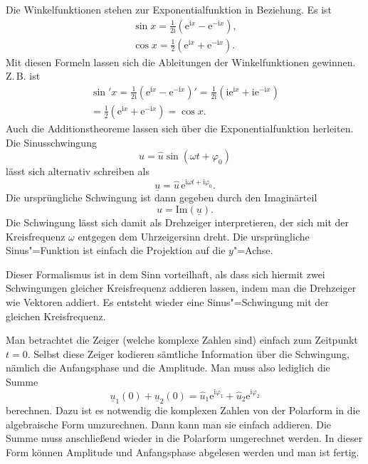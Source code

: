 \documentclass[a4paper,11pt,fleqn,twocolumn,twoside]{scrartcl}
\numberwithin{equation}{section}
\newcommand{\ui}{\mathrm i}
\newcommand{\ee}{\mathrm e}
\begin{document}
Die Winkelfunktionen stehen zur Exponentialfunktion
in Beziehung. Es ist%
\begin{gather}
\sin x = \frac{1}{2\ui}(\mathrm{e}^{\ui x}-\mathrm{e}^{-\ui x}),\\
\cos x = \frac{1}{2}(\mathrm{e}^{\ui x}+\mathrm{e}^{-\ui x}).
\end{gather}
Mit diesen Formeln lassen sich die Ableitungen der Winkelfunktionen
gewinnen. Z.\,B. ist%
\begin{gather}
\sin' x = \frac{1}{2\ui}(\ee^{\ui x}-\ee^{-\ui x})'
= \frac{1}{2\ui}(\ui\ee^{\ui x}+\ui\ee^{-\ui x})\\
= \frac{1}{2}(\ee^{\ui x}+\ee^{-\ui x})
= \cos x.
\end{gather}
Auch die Additionstheoreme lassen sich über die Exponentialfunktion
herleiten. Die Sinusschwingung%
\begin{equation}
u = \hat u\sin(\omega t+\varphi_0)
\end{equation}
lässt sich alternativ schreiben als
\begin{equation}
\underline u = \hat u\,\ee^{\ui\omega t+\ui\varphi_0}.
\end{equation}
Die ursprüngliche Schwingung ist dann gegeben durch den Imaginärteil%
\begin{equation}
u = \mathrm{Im}(\underline u).
\end{equation}
Die Schwingung lässt sich damit als Drehzeiger interpretieren, der
sich mit der Kreisfrequenz $\omega$ entgegen dem Uhrzeigersinn
dreht. Die ursprüngliche Sinus"=Funktion ist einfach die Projektion
auf die $y$"=Achse.

Dieser Formalismus ist in dem Sinn vorteilhaft, als dass sich hiermit
zwei Schwingungen gleicher Kreisfrequenz addieren lassen, indem man
die Drehzeiger wie Vektoren addiert. Es entsteht wieder eine
Sinus"=Schwingung mit der gleichen Kreisfrequenz.

Man betrachtet die Zeiger (welche komplexe Zahlen sind) einfach zum
Zeitpunkt $t=0$. Selbst diese Zeiger kodieren sämtliche Information
über die Schwingung, nämlich die Anfangsphase und die Amplitude. Man
muss also lediglich die Summe%
\begin{equation}
\underline{u}_1(0)+\underline{u}_2(0)
= \hat u_1\ee^{\ui\varphi_1}+\hat u_2\ee^{\ui\varphi_2}
\end{equation}
berechnen. Dazu ist es notwendig die komplexen Zahlen von der
Polarform in die algebraische Form umzurechnen.
Dann kann man sie einfach addieren. Die Summe muss anschließend wieder
in die Polarform umgerechnet werden. In dieser Form können Amplitude
und Anfangsphase abgelesen werden und man ist fertig.
\end{document}
